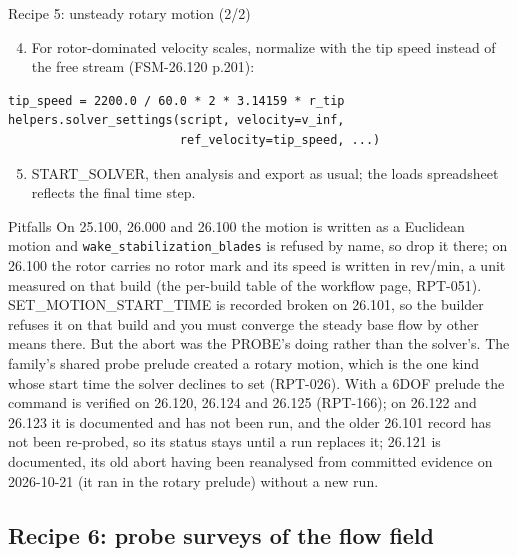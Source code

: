 \documentclass[aspectratio=169,10pt]{beamer}
\newcommand{\code}[1]{\texttt{\small #1}}
\begin{document}
\begin{frame}{Recipe 5: unsteady rotary motion (2/2)}
  \begin{enumerate}
    \setcounter{enumi}{3}
    \item For rotor-dominated velocity scales, normalize with the tip speed instead of the free stream (FSM-26.120 p.201):
  \end{enumerate}
\begin{lstlisting}
tip_speed = 2200.0 / 60.0 * 2 * 3.14159 * r_tip
helpers.solver_settings(script, velocity=v_inf,
                        ref_velocity=tip_speed, ...)
\end{lstlisting}
  \begin{enumerate}
    \setcounter{enumi}{4}
    \item START\_SOLVER, then analysis and export as usual; the loads spreadsheet reflects the final time step.
  \end{enumerate}
  \begin{alertblock}{Pitfalls}
    On 25.100, 26.000 and 26.100 the motion is written as a Euclidean motion and \code{wake\_stabilization\_blades} is refused by name, so drop it there; on 26.100 the rotor carries no rotor mark and its speed is written in rev/min, a unit measured on that build (the per-build table of the workflow page, RPT-051).
    SET\_MOTION\_START\_TIME is recorded {\color{statusred}broken} on 26.101, so the builder refuses it on that build and you must converge the steady base flow by other means there. But the abort was the PROBE's doing rather than the solver's. The family's shared probe prelude created a rotary motion, which is the one kind whose start time the solver declines to set (RPT-026). With a 6DOF prelude the command is {\color{statusblue}verified} on 26.120, 26.124 and 26.125 (RPT-166); on 26.122 and 26.123 it is documented and has not been run, and the older 26.101 record has not been re-probed, so its status stays until a run replaces it; 26.121 is documented, its old abort having been reanalysed from committed evidence on 2026-10-21 (it ran in the rotary prelude) without a new run.
  \end{alertblock}
\end{frame}

\subsection{Recipe 6: probe surveys of the flow field}
\end{document}
